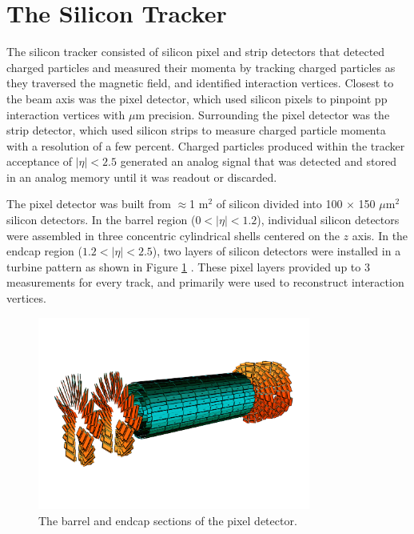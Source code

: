 \section{The Silicon Tracker}
\label{sec:siTrackerDescription}
The silicon tracker consisted of silicon pixel and strip detectors that detected charged particles and measured their 
momenta by tracking charged particles as they traversed the magnetic field, and identified interaction vertices.  Closest 
to the beam axis was the pixel detector, which used silicon pixels to pinpoint pp interaction vertices with $\mu$m precision.  
Surrounding the pixel detector was the strip detector, which used silicon strips to measure charged particle momenta with 
a resolution of a few percent.  Charged particles produced within the tracker acceptance of $|\eta| < 2.5$ generated an 
analog signal that was detected and stored in an analog memory until it was readout or discarded.

The pixel detector was built from $\approx$1 m$^{2}$ of silicon divided into 100 $\times$ 150 $\mu$m$^{2}$ silicon detectors.  
In the barrel region ($0 < |\eta| < 1.2$), individual silicon detectors were assembled in three concentric cylindrical shells 
centered on the $z$ axis.  In the endcap region ($1.2 < |\eta| < 2.5$), two layers of silicon detectors were 
installed in a turbine pattern as shown in Figure \ref{fig:pixelTracker} \cite{pixelCommissioning}.  These pixel 
layers provided up to 3 measurements for every track, and primarily were used to reconstruct interaction 
vertices.

\begin{figure}[ht]
	\centering
	\includegraphics[width=0.8\textwidth]{figures/pixelDetectorSchematic.png}
	\caption{The barrel and endcap sections of the pixel detector.}
	\label{fig:pixelTracker}
\end{figure}

